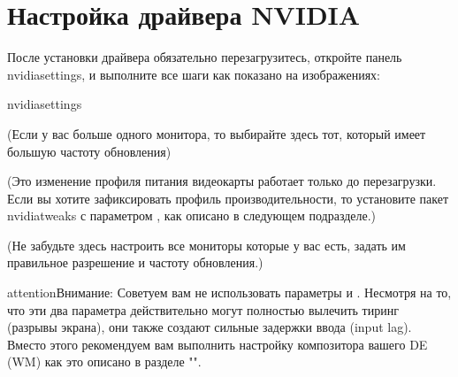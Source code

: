 \documentclass[letterpaper,10pt,russian,openany]{sphinxmanual}
\begin{document}
\ignorespaces 

\section{Настройка драйвера NVIDIA}
\label{\detokenize{source/first-steps:nvidia-driver-setup}}\label{\detokenize{source/first-steps:index-8}}\label{\detokenize{source/first-steps:id8}}
\sphinxAtStartPar
После установки драйвера обязательно перезагрузитесь, откройте панель nvidia\sphinxhyphen{}settings, и выполните все шаги как показано на изображениях:

\begin{sphinxVerbatim}[commandchars=\\\{\}]
nvidia\PYGZhy{}settings 
\end{sphinxVerbatim}

\noindent{}

\sphinxAtStartPar
(Если у вас больше одного монитора, то выбирайте здесь тот, который имеет большую частоту обновления)

\noindent{}

\sphinxAtStartPar
(Это изменение профиля питания видеокарты работает только до перезагрузки.
Если вы хотите зафиксировать профиль производительности,
то установите пакет nvidia\sphinxhyphen{}tweaks с параметром , как описано в следующем подразделе.)

\noindent{}

\sphinxAtStartPar
(Не забудьте здесь настроить все мониторы которые у вас есть, задать им правильное разрешение и частоту обновления.)

\begin{sphinxadmonition}{attention}{Внимание:}
\sphinxAtStartPar
Советуем вам не использовать параметры  и .
Несмотря на то, что эти два параметра действительно могут полностью вылечить тиринг (разрывы экрана), они также создают сильные задержки ввода (input lag).
Вместо этого рекомендуем вам выполнить настройку композитора вашего DE (WM) как это описано в разделе "".
\end{sphinxadmonition}
\end{document}

